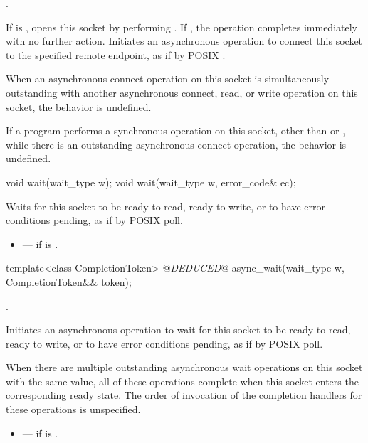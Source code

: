\begin{itemdescr}
\pnum
\completionsig {}.

\pnum
\effects If  is , opens this socket by performing . If , the operation completes immediately with no further action. Initiates an asynchronous operation to connect this socket to the specified remote endpoint, as if by POSIX .

\pnum
 When an asynchronous connect operation on this socket is simultaneously outstanding with another asynchronous connect, read, or write operation on this socket, the behavior is undefined.

\pnum
If a program performs a synchronous operation on this socket, other than  or , while there is an outstanding asynchronous connect operation, the behavior is undefined.
\end{itemdescr}

\begin{itemdecl}
void wait(wait_type w);
void wait(wait_type w, error_code& ec);
\end{itemdecl}

\begin{itemdescr}
\pnum
\effects Waits for this socket to be ready to read, ready to write, or to have error conditions pending, as if by POSIX poll.

\pnum
\errors
\begin{itemize}
\item
{} --- if  is .
\end{itemize}
\end{itemdescr}

\begin{itemdecl}
template<class CompletionToken>
  @\textit{DEDUCED}@ async_wait(wait_type w, CompletionToken&& token);
\end{itemdecl}

\begin{itemdescr}
\pnum
\completionsig {}.

\pnum
\effects Initiates an asynchronous operation to wait for this socket to be ready to read, ready to write, or to have error conditions pending, as if by POSIX poll.

\pnum
When there are multiple outstanding asynchronous wait operations on this socket with the same  value, all of these operations complete when this socket enters the corresponding ready state. The order of invocation of the completion handlers for these operations is unspecified.

\pnum
\errors
\begin{itemize}
\item
{} --- if  is .
\end{itemize}
\end{itemdescr}




